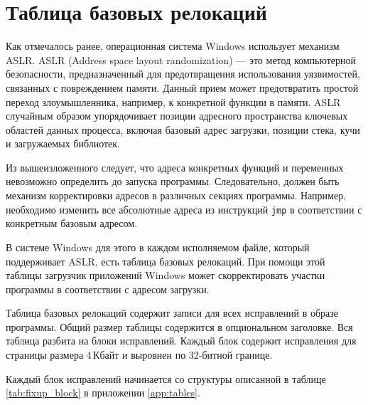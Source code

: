 
\section{Таблица базовых релокаций}

Как отмечалось ранее, операционная система Windows использует механизм ASLR.
ASLR (Address space layout randomization) --- это метод компьютерной
безопасности, предназначенный для предотвращения использования уязвимостей,
связанных с повреждением памяти. Данный прием может предотвратить простой
переход злоумышленника, например, к конкретной функции в памяти. ASLR случайным
образом упорядочивает позиции адресного пространства ключевых областей данных
процесса, включая базовый адрес загрузки, позиции стека, кучи и загружаемых
библиотек.

Из вышеизложенного следует, что адреса конкретных функций и переменных
невозможно определить до запуска программы. Следовательно, должен быть механизм
корректировки адресов в различных секциях программы. Например, необходимо
изменить все абсолютные адреса из инструкций \verb!jmp! в соответствии с
конкретным базовым адресом.

В системе Windows для этого в каждом исполняемом файле, который поддерживает
ASLR, есть таблица базовых релокаций. При помощи этой таблицы загрузчик
приложений Windows может скорректировать участки программы в соответствии с
адресом загрузки.

Таблица базовых релокаций содержит записи для всех исправлений в образе
программы. Общий размер таблицы содержится в опциональном заголовке. Вся таблица
разбита на блоки исправлений. Каждый блок содержит исправления для страницы
размера 4\,Кбайт и выровнен по 32-битной границе. 

Каждый блок исправлений начинается со структуры описанной в таблице 
\ref{tab:fixup_block} в приложении \ref{app:tables}.


